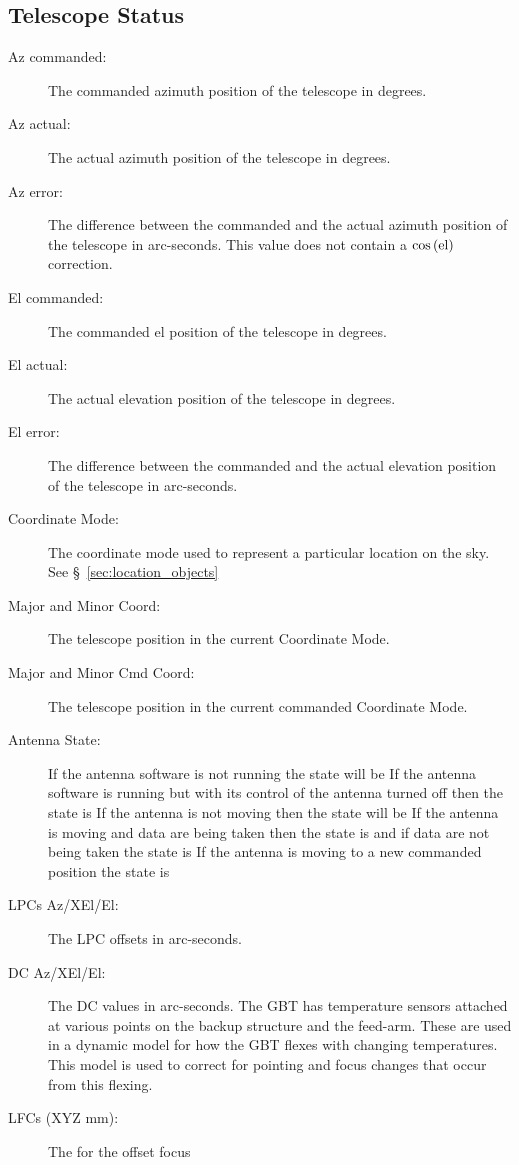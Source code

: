 \subsection{Telescope Status}
\begin{description}
\item[Az commanded:] The commanded azimuth position of the telescope in degrees.
\item[Az actual:] The actual azimuth position of the telescope in degrees.
\item[Az error:] The difference between the commanded and the actual azimuth 
position of the telescope in arc-seconds.  This value does not contain a 
$\cos\left( {\rm el} \right) $ correction.
\item[El commanded:] The commanded el position of the telescope in degrees.
\item[El actual:] The actual elevation position of the telescope in degrees.
\item[El error:] The difference between the commanded and the actual elevation 
position of the telescope in arc-seconds.
\item[Coordinate Mode:] The coordinate mode used to represent a particular
location on the sky. See \S~\ref{sec:location_objects}
\item[Major and Minor Coord:] The telescope position in the current Coordinate Mode.
\item[Major and Minor Cmd Coord:] The telescope position in the current commanded
Coordinate Mode.
\item[Antenna State:] If the antenna software is not running the state will be
 If the antenna software is running but with its control of the antenna
turned off then the state is   If the antenna is not moving then the state
will be   If the antenna is moving and data are being taken then the state is
 and if data are not being taken the state is   If the antenna is
moving to a new commanded position the state is 
\item[LPCs Az/XEl/El:] The \gls{LPC} offsets in arc-seconds.
\item[DC Az/XEl/El:] The \gls{DC} values in arc-seconds.
The \gls{GBT} has temperature sensors attached at various points on the backup
structure and the feed-arm.  These are used in a dynamic model for how the
\gls{GBT} flexes with changing temperatures.  This model is used to correct for
pointing and focus changes that occur from this flexing.
\item[LFCs (XYZ mm):] The  for the offset focus

\end{description}
